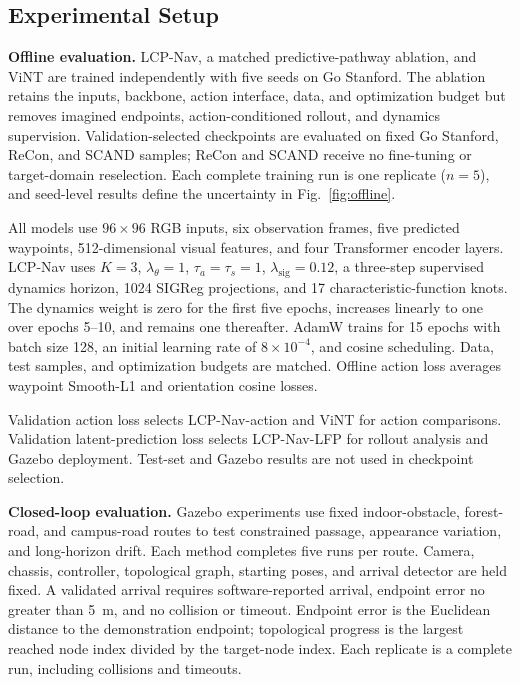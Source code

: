 \documentclass[conference]{IEEEtran}
\begin{document}
\subsection{Experimental Setup}

\textbf{Offline evaluation.} LCP-Nav, a matched predictive-pathway ablation, and ViNT are trained independently with five seeds on Go Stanford. The ablation retains the inputs, backbone, action interface, data, and optimization budget but removes imagined endpoints, action-conditioned rollout, and dynamics supervision. Validation-selected checkpoints are evaluated on fixed Go Stanford, ReCon, and SCAND samples; ReCon and SCAND receive no fine-tuning or target-domain reselection. Each complete training run is one replicate ($n=5$), and seed-level results define the uncertainty in Fig.~\ref{fig:offline}.

All models use $96\times96$ RGB inputs, six observation frames, five predicted waypoints, 512-dimensional visual features, and four Transformer encoder layers. LCP-Nav uses $K=3$, $\lambda_\theta=1$, $\tau_a=\tau_s=1$, $\lambda_{\mathrm{sig}}=0.12$, a three-step supervised dynamics horizon, 1024 SIGReg projections, and 17 characteristic-function knots. The dynamics weight is zero for the first five epochs, increases linearly to one over epochs 5--10, and remains one thereafter. AdamW trains for 15 epochs with batch size 128, an initial learning rate of $8\times10^{-4}$, and cosine scheduling. Data, test samples, and optimization budgets are matched. Offline action loss averages waypoint Smooth-L1 and orientation cosine losses.

Validation action loss selects LCP-Nav-action and ViNT for action comparisons. Validation latent-prediction loss selects LCP-Nav-LFP for rollout analysis and Gazebo deployment. Test-set and Gazebo results are not used in checkpoint selection.

\textbf{Closed-loop evaluation.} Gazebo experiments use fixed indoor-obstacle, forest-road, and campus-road routes to test constrained passage, appearance variation, and long-horizon drift. Each method completes five runs per route. Camera, chassis, controller, topological graph, starting poses, and arrival detector are held fixed. A validated arrival requires software-reported arrival, endpoint error no greater than 5~m, and no collision or timeout. Endpoint error is the Euclidean distance to the demonstration endpoint; topological progress is the largest reached node index divided by the target-node index. Each replicate is a complete run, including collisions and timeouts.
\end{document}
